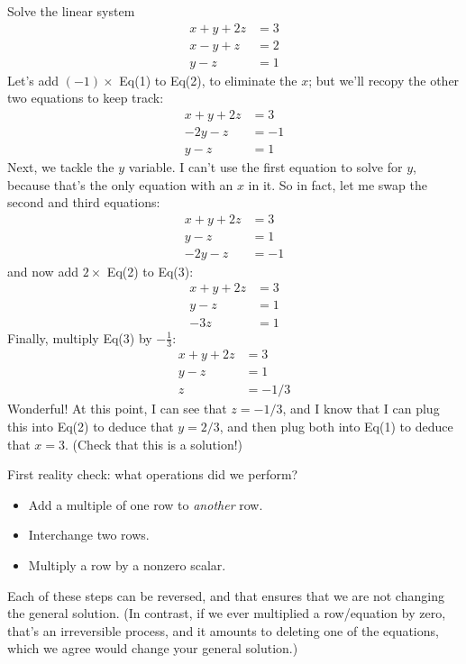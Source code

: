 \begin{myexample}
Solve the linear system
\begin{align*}
x + y + 2z &= 3\\
x - y + z &= 2\\
  y-z &=1
\end{align*}
Let's add $(-1)\times$ Eq(1) to Eq(2), to eliminate the $x$; 
but we'll recopy the other two equations to keep track:
\begin{align*}
 x + y + 2z &= 3\\
 - 2y - z &= -1\\
  y-z &=1
\end{align*}
Next, we tackle the $y$ variable.  I can't use the first
equation to solve for $y$, because that's the only equation
with an $x$ in it.  So in fact, let me swap the second
and third equations:
\begin{align*}
 x + y + 2z &= 3\\
  y-z &=1\\
- 2y - z &= -1 
\end{align*}
and now add $2\times$ Eq(2) to Eq(3):
\begin{align*}
  x + y + 2z &= 3\\
  y-z &=1\\
  -3 z &= 1 
\end{align*}
Finally, multiply Eq(3) by $-\frac13$:
\begin{align*}
  x + y + 2z &= 3\\
  y-z &=1\\
  z &= -1/3 
\end{align*}
Wonderful!  At this point, I can see that $z=-1/3$, and
I know that I can plug this into Eq(2) to deduce that $y=2/3$,
and then plug both into Eq(1) to deduce that $x = 3$.
(Check that this is a solution!)
\end{myexample}

First reality check:  what operations did we perform?
\begin{itemize}
\item Add a multiple of one row to \emph{another} row.
\item Interchange two rows.
\item Multiply a row by a nonzero scalar.
\end{itemize}
Each of these steps can be reversed, and that ensures
that we are not changing the general solution.  (In
contrast, if we ever multiplied a row/equation by zero,
that's an irreversible process, and it amounts to deleting
one of the equations, which we agree would change your
general solution.)

